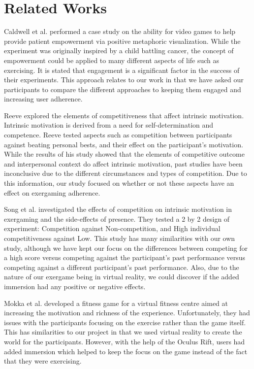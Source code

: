 \documentclass[11pt, 
]{IEEEtran}
\begin{document}
\section{Related Works} \label{Related Works}

Caldwell et al. \cite{caldwell2013intersection} performed a case study on the ability for video games to help provide patient empowerment via positive metaphoric visualization. While the experiment was originally inspired by a child battling cancer, the concept of empowerment could be applied to many different aspects of life such as exercising. It is stated that engagement is a significant factor in the success of their experiments. This approach relates to our work in that we have asked our participants to compare the different approaches to keeping them engaged and increasing user adherence.

Reeve \cite{reeve1996elements} explored the elements of competitiveness that affect intrinsic motivation. Intrinsic motivation is derived from a need for self-determination and competence. Reeve tested aspects such as competition between participants against beating personal bests, and their effect on the participant's motivation. While the results of his study showed that the elements of competitive outcome and interpersonal context do affect intrinsic motivation, past studies have been inconclusive due to the different circumstances and types of competition. Due to this information, our study focused on whether or not these aspects have an effect on exergaming adherence.

Song et al. \cite{song2010effects} investigated the effects of competition on intrinsic motivation in exergaming and the side-effects of presence. They tested a 2 by 2 design of experiment: Competition against Non-competition, and High individual competitiveness against Low. This study has many similarities with our own study, although we have kept our focus on the differences between competing for a high score versus competing against the participant's past performance versus competing against a different participant's past performance. Also, due to the nature of our exergame being in virtual reality, we could discover if the added immersion had any positive or negative effects.

Mokka et al. \cite{mokka2003fitness} developed a fitness game for a virtual fitness centre aimed at increasing the motivation and richness of the experience. Unfortunately, they had issues with the participants focusing on the exercise rather than the game itself. This has similarities to our project in that we used virtual reality to create the world for the participants. However, with the help of the Oculus Rift, users had added immersion which helped to keep the focus on the game instead of the fact that they were exercising.
\end{document}
